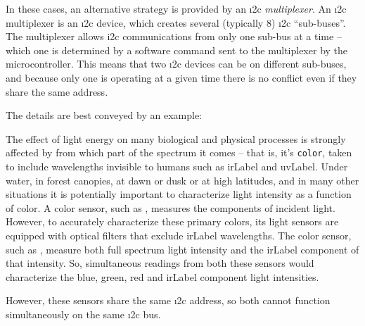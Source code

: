 In these cases, an alternative strategy is provided by an \i2c \emph{multiplexer}.
An \i2c multiplexer is an \i2c device, which creates several (typically 8) \i2c ``sub-buses''.
The multiplexer allows i2c communications from only one sub-bus at a time -- which one is determined by a software command sent to the multiplexer by the microcontroller.
This means that two \i2c devices can be on different sub-buses, and because only one is operating at a given time there is no conflict even if they share the same address.

The details are best conveyed by an example:

\smallskip

The effect of light energy on many biological and physical processes is strongly affected by from which part of the spectrum it comes -- that is, it's \texttt{color}, taken to include wavelengths invisible to humans such as \gls{irLabel} and \gls{uvLabel}.
Under water, in forest canopies, at dawn or dusk or at high latitudes, and in many other situations it is potentially important to characterize light intensity as a function of color.
A  color sensor, such as , measures the  components of incident light.
However, to accurately characterize these primary colors, its light sensors are equipped with optical filters that exclude \gls{irLabel} wavelengths.
The  color sensor, such as , measure both full spectrum light intensity and the \gls{irLabel} component of that intensity.
So, simultaneous readings from both these sensors would characterize the blue, green, red and \gls{irLabel} component light intensities.

However, these sensors share the same \i2c address, so both cannot function simultaneously on the same \i2c bus.

